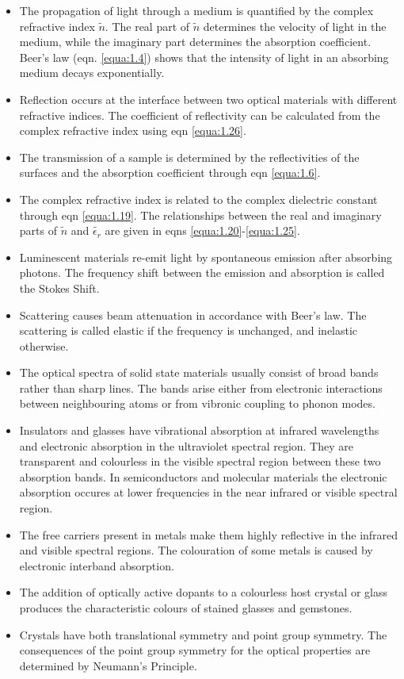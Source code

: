 \documentclass[12pt]{book}
\begin{document}
\begin{shaded}
\begin{itemize}
  \item The propagation of light through a medium is quantified by the complex refractive index $\tilde{n}$. The real part of $\tilde{n}$ determines the velocity of light in the medium, while the imaginary part determines the absorption coefficient. Beer's law (eqn. \ref{equa:1.4}) shows that the intensity of light in an absorbing medium decays exponentially.
  \item Reflection occurs at the interface between two optical materials with different refractive indices. The coefficient of reflectivity can be calculated from the complex refractive index using eqn \ref{equa:1.26}.
  \item The transmission of a sample is determined by the reflectivities of the surfaces and the absorption coefficient through eqn \ref{equa:1.6}.
  \item The complex refractive index is related to the complex dielectric constant through eqn \ref{equa:1.19}. The relationships between the real and imaginary parts of $\tilde{n}$ and $\tilde{\epsilon_r}$ are given in eqns \ref{equa:1.20}-\ref{equa:1.25}.
  \item Luminescent materials re-emit light by spontaneous emission after absorbing photons. The frequency shift between the emission and absorption is called the Stokes Shift.
  \item Scattering causes beam attenuation in accordance with Beer's law. The scattering is called elastic if the frequency is unchanged, and inelastic otherwise.
  \item The optical spectra of solid state materials usually consist of broad bands rather than sharp lines. The bands arise either from electronic interactions between neighbouring atoms or from vibronic coupling to phonon modes.
  \item Insulators and glasses have vibrational absorption at infrared wavelengths and electronic absorption in the ultraviolet spectral region. They are transparent and colourless in the visible spectral region between these two absorption bands. In semiconductors and molecular materials the electronic absorption occures at lower frequencies in the near infrared or visible spectral region.
  \item The free carriers present in metals make them highly reflective in the infrared and visible spectral regions. The colouration of some metals is caused by electronic interband absorption.
  \item The addition of optically active dopants to a colourless host crystal or glass produces the characteristic colours of stained glasses and gemstones.
  \item Crystals have both translational symmetry and point group symmetry. The consequences of the point group symmetry for the optical properties are determined by Neumann's Principle.
\end{itemize}
\end{shaded}
\end{document}
